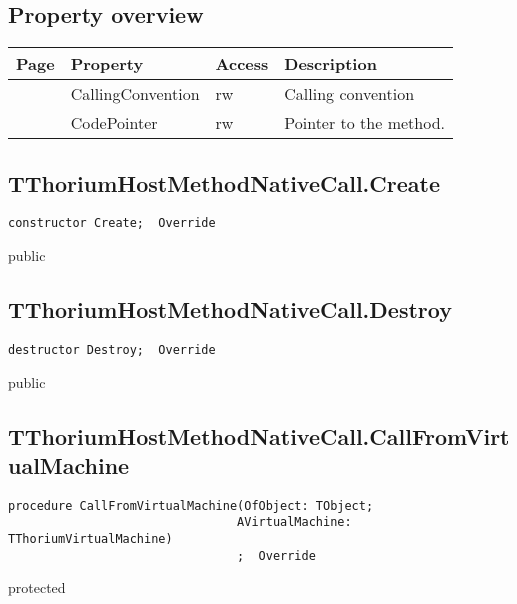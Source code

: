 \subsection{Property overview}
\label{thoriumcorepkg:thorium:tthoriumhostmethodnativecall:properties}
\begin{tabularx}{\textwidth}{lllX}
Page & Property & Access & Description \\ \hline
\pageref{thoriumcorepkg:thorium:tthoriumhostmethodnativecall:callingconvention} & CallingConvention & rw & Calling convention \\
\pageref{thoriumcorepkg:thorium:tthoriumhostmethodnativecall:codepointer} & CodePointer & rw & Pointer to the method. \\
\hline
\end{tabularx}
\subsection{TThoriumHostMethodNativeCall.Create}
\label{thoriumcorepkg:thorium:tthoriumhostmethodnativecall:create}
\begin{FPCList}
\Declaration 

\begin{verbatim}
constructor Create;  Override
\end{verbatim}
\Visibility
public
\end{FPCList}
\subsection{TThoriumHostMethodNativeCall.Destroy}
\label{thoriumcorepkg:thorium:tthoriumhostmethodnativecall:destroy}
\begin{FPCList}
\Declaration 

\begin{verbatim}
destructor Destroy;  Override
\end{verbatim}
\Visibility
public
\end{FPCList}
\subsection{TThoriumHostMethodNativeCall.CallFromVirtualMachine}
\label{thoriumcorepkg:thorium:tthoriumhostmethodnativecall:callfromvirtualmachine}
\begin{FPCList}
\Declaration 

\begin{verbatim}
procedure CallFromVirtualMachine(OfObject: TObject;
                                AVirtualMachine: TThoriumVirtualMachine)
                                ;  Override
\end{verbatim}
\Visibility
protected
\end{FPCList}

